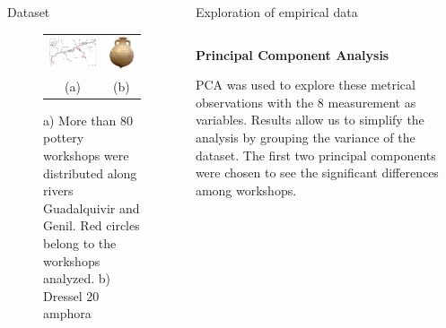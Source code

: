 \documentclass[final]{beamer}
\newlength{\onecolwid}
\newlength{\twocolwid}
\begin{document}
\begin{frame}[t]
\begin{columns}[t]
\begin{column}{\onecolwid}
\begin{block}{Dataset}
\begin{figure}
\begin{tabular}{cc}


\includegraphics[width=0.7\linewidth]{images/fig1.png} &
\includegraphics[width=0.2\linewidth]{images/amphorae.png} \\
(a) & (b)
\end{tabular}

\singlespace
\caption{a) More than 80 pottery workshops were distributed along rivers Guadalquivir and Genil. Red circles belong to the workshops analyzed. b) Dressel 20 amphora}
\label{fig:betica}
\end{figure}


 \end{block}
\end{column} %

\begin{column}{\twocolwid}


\begin{block}{Exploration of empirical data}
\begin{columns}[t,totalwidth=\twocolwid]



\begin{column}{\onecolwid} %


{\textbf{Principal Component Analysis}} 
\justify

PCA was used to explore these metrical observations with the 8 measurement as variables. Results allow us to simplify the analysis by grouping the variance of the dataset. The first two principal components were chosen to see the significant differences among workshops. 


\end{column}
\end{columns}
\end{block}
\end{column}
\end{columns}
\end{frame}
\end{document}
